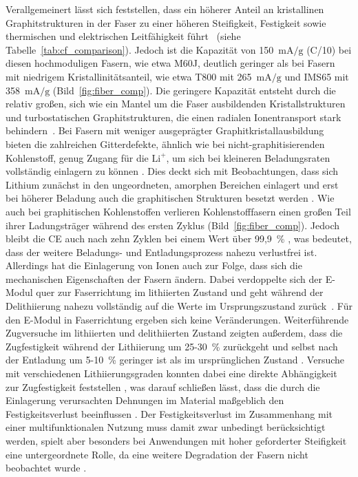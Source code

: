 Verallgemeinert lässt sich feststellen, dass ein höherer Anteil an kristallinen Graphitstrukturen in der Faser zu einer höheren Steifigkeit, Festigkeit sowie thermischen und elektrischen Leitfähigkeit führt~\cite{Zenkert2024} (siehe Tabelle~\ref{tab:cf_comparison}). Jedoch ist die Kapazität von 150~$\si{\mA\per\g}$ (C/10) bei diesen hochmoduligen Fasern, wie etwa M60J, deutlich geringer als bei Fasern mit niedrigem Kristallinitätsanteil, wie etwa T800 mit 265~$\si{\mA\per\g}$ und IMS65 mit 358~$\si{\mA\per\g}$ \cite{Fredi2018} (Bild~\ref{fig:fiber_comp}). Die geringere Kapazität entsteht durch die relativ großen, sich wie ein Mantel um die Faser ausbildenden Kristallstrukturen und turbostatischen Graphitstrukturen, die einen radialen Ionentransport stark behindern~\cite{Zenkert2024,He2021}. Bei Fasern mit weniger ausgeprägter Graphitkristallausbildung bieten die zahlreichen Gitterdefekte, ähnlich wie bei nicht-graphitisierenden Kohlenstoff, genug Zugang für die $\text{Li}^{+}$, um sich bei kleineren Beladungsraten vollständig einlagern zu können \cite{Fredi2018}. Dies deckt sich mit Beobachtungen, dass sich Lithium zunächst in den ungeordneten, amorphen Bereichen einlagert und erst bei höherer Beladung auch die graphitischen Strukturen besetzt werden \cite{Fang2022}. Wie auch bei graphitischen Kohlenstoffen verlieren Kohlenstofffasern einen großen Teil ihrer Ladungsträger während des ersten Zyklus \cite{Jacques2013} (Bild~\ref{fig:fiber_comp}). Jedoch bleibt die CE auch nach zehn Zyklen bei einem Wert über 99,9~\% \cite{Hagberg2016}, was bedeutet, dass der weitere Beladungs- und Entladungsprozess nahezu verlustfrei ist. Allerdings hat die Einlagerung von Ionen auch zur Folge, dass sich die mechanischen Eigenschaften der Fasern ändern. Dabei verdoppelte sich der E-Modul quer zur Faserrichtung im lithiierten Zustand und geht während der Delithiierung nahezu vollständig auf die Werte im Ursprungszustand zurück~\cite{Duan2021}. Für den E-Modul in Faserrichtung ergeben sich keine Veränderungen. Weiterführende Zugversuche im lithiierten und delithiierten Zustand zeigten außerdem, dass die Zugfestigkeit während der Lithiierung um 25-30~\% zurückgeht und selbst nach der Entladung um 5-10~\% geringer ist als im ursprünglichen Zustand \cite{Jacques2012}. Versuche mit verschiedenen Lithiierungsgraden konnten dabei eine direkte Abhängigkeit zur Zugfestigkeit feststellen \cite{Jacques2014}, was darauf schließen lässt, dass die durch die Einlagerung verursachten Dehnungen im Material maßgeblich den Festigkeitsverlust beeinflussen \cite{Zenkert2024}. Der Festigkeitsverlust im Zusammenhang mit einer multifunktionalen Nutzung muss damit zwar unbedingt berücksichtigt werden, spielt aber besonders bei Anwendungen mit hoher geforderter Steifigkeit eine untergeordnete Rolle, da eine weitere Degradation der Fasern nicht beobachtet wurde \cite{Zenkert2024}.

